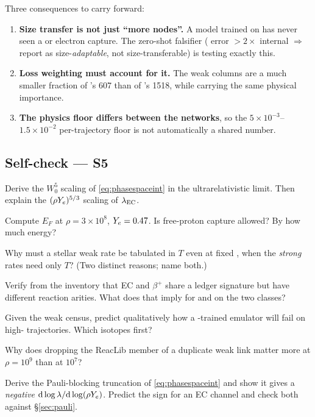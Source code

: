Three consequences to carry forward:

\begin{enumerate}
\item \textbf{Size transfer is not just ``more nodes''.} A model trained on
       has never seen a  or  electron capture.
      The zero-shot  falsifier (\Ye{} error $> 2\times$ internal
      $\Rightarrow$ report as size-\emph{adaptable}, not size-transferable) is
      testing exactly this.
\item \textbf{Loss weighting must account for it.} The weak columns are a much
      smaller fraction of 's 607 than of 's 1518, while
      carrying the same physical importance.
\item \textbf{The \Ye{} physics floor differs between the networks}, so the
      $5\times10^{-3}$--$1.5\times10^{-2}$ per-trajectory floor is not
      automatically a shared number.
\end{enumerate}

\subsection*{Self-check --- S5}
\label{sec:selfcheck-weak}

\begin{selfcheck}
\item Derive the $W_0^5$ scaling of \eqref{eq:phasespaceint} in the
      ultrarelativistic limit. Then explain the $(\rho Y_{e})^{5/3}$ scaling of
      $\lambda_{\rm EC}$.
\item Compute $E_F$ at $\rho = 3\times10^8$, $Y_{e} = 0.47$. Is free-proton
      capture allowed? By how much energy?
\item Why must a stellar weak rate be tabulated in $T$ even at fixed \rhoye,
      when the \emph{strong} rates need only $T$? (Two distinct reasons; name
      both.)
\item Verify from the inventory that EC and $\beta^+$ share a ledger signature
      but have different reaction arities. What does that imply for
       and  on the two classes?
\item Given the  weak census, predict qualitatively how a
      -trained emulator will fail on  high-\Ye{} trajectories.
      Which isotopes first?
\item Why does dropping the ReacLib member of a duplicate weak link matter more
      at $\rho = 10^9$ than at $10^7$?
\item Derive the Pauli-blocking truncation of \eqref{eq:phasespaceint} and show
      it gives a \emph{negative} $\mathrm{d}\log\lambda/\mathrm{d}\log(\rho Y_{e})$. Predict the
      sign for an EC channel and check both against \S\ref{sec:pauli}.
\end{selfcheck}

